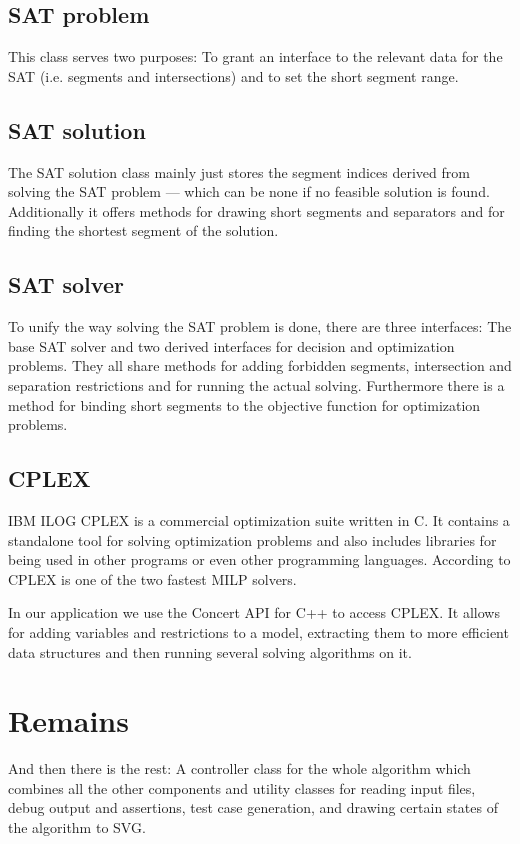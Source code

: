 \subsection{SAT problem}
This class serves two purposes: To grant an interface to the relevant
data for the SAT (i.e. segments and intersections) and to set the
short segment range.

\subsection{SAT solution}
The SAT solution class mainly just stores the segment indices derived
from solving the SAT problem --- which can be none if no feasible
solution is found. Additionally it offers methods for drawing short
segments and separators and for finding the shortest segment of the
solution.

\subsection{SAT solver}
To unify the way solving the SAT problem is done, there are three
interfaces: The base SAT solver and two derived interfaces for
decision and optimization problems. They all share methods for adding
forbidden segments, intersection and separation restrictions and for
running the actual solving. Furthermore there is a method for binding
short segments to the objective function for optimization problems.

\subsection{CPLEX}
IBM ILOG CPLEX \cite{cplex}
is a commercial optimization suite written in C. It contains a
standalone tool for solving optimization problems and also includes
libraries for being used in other programs or even other programming
languages. According to \cite{cplex_benchmark}
CPLEX is one of the two fastest MILP solvers.

In our application we use the Concert API for C++ \cite{cplex_concert}
to access CPLEX. It allows for adding variables and restrictions to
a model, extracting them to more efficient data structures and then
running several solving algorithms on it.

\section{Remains}
And then there is the rest: A controller
class for the whole algorithm which combines all the other components
and utility classes for reading input files, debug
output and assertions, test case generation, and drawing certain 
states of the algorithm to SVG.

